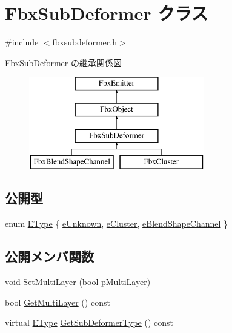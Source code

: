 \hypertarget{class_fbx_sub_deformer}{}\section{Fbx\+Sub\+Deformer クラス}
\label{class_fbx_sub_deformer}


{\ttfamily \#include $<$fbxsubdeformer.\+h$>$}

Fbx\+Sub\+Deformer の継承関係図\begin{figure}[H]
\begin{center}
\leavevmode
\includegraphics[height=4.000000cm]{class_fbx_sub_deformer}
\end{center}
\end{figure}
\subsection*{公開型}
\begin{DoxyCompactItemize}
\item 
enum \hyperlink{class_fbx_sub_deformer_aed7eba8aabbb8b25a8ddbab127d67319}{E\+Type} \{ \hyperlink{class_fbx_sub_deformer_aed7eba8aabbb8b25a8ddbab127d67319a688c70619ed57e89246838f7b89640cf}{e\+Unknown}, 
\hyperlink{class_fbx_sub_deformer_aed7eba8aabbb8b25a8ddbab127d67319a329357c41a658df236d0802d586c2643}{e\+Cluster}, 
\hyperlink{class_fbx_sub_deformer_aed7eba8aabbb8b25a8ddbab127d67319a1082bcdf5d88e593ea78a8da89b5cebd}{e\+Blend\+Shape\+Channel}
 \}
\end{DoxyCompactItemize}
\subsection*{公開メンバ関数}
\begin{DoxyCompactItemize}
\item 
void \hyperlink{class_fbx_sub_deformer_a46748fbb4e8496449bb28e6eeefde288}{Set\+Multi\+Layer} (bool p\+Multi\+Layer)
\item 
bool \hyperlink{class_fbx_sub_deformer_a9a430ccafe4f08c976b9963627b5de05}{Get\+Multi\+Layer} () const
\item 
virtual \hyperlink{class_fbx_sub_deformer_aed7eba8aabbb8b25a8ddbab127d67319}{E\+Type} \hyperlink{class_fbx_sub_deformer_a1a1998b98ca03598bc6bec630e1aaa97}{Get\+Sub\+Deformer\+Type} () const
\end{DoxyCompactItemize}
